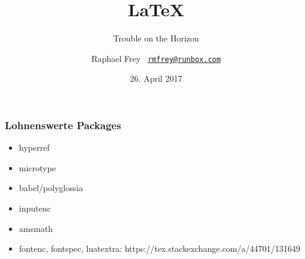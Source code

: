 \documentclass{beamer}                %
\title{\vspace*{4em}\Huge\LaTeX}
\subtitle{\hfill Trouble on the Horizon}
\date{26. April 2017}
\author{%
    Raphael Frey%
    \hfill%
    \scriptsize\texttt{%
        \href{mailto:rmfrey@runbox.com}%
        {rmfrey@runbox.com}}}
\begin{document}

\frame[plain]{\titlepage} %

\begin{frame} %
    \frametitle{Lohnenswerte Packages}
    \begin{itemize}
        \item hyperref
        \item microtype
        \item babel/polyglossia
        \item inputenc
        \item amsmath
        \item fontenc, fontspec, luatextra: https://tex.stackexchange.com/a/44701/131649
    \end{itemize}
\end{frame}%
\end{document}
